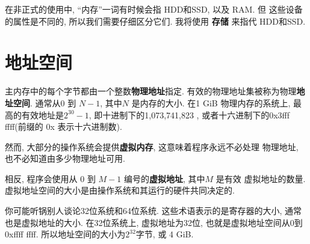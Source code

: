 \documentclass[12pt]{book}
\begin{document}
{在非正式的使用中, ``内存''一词有时候会指 HDD和SSD, 以及 RAM. 但
这些设备的属性是不同的, 所以我们需要仔细区分它们. 我将使用
{\bf 存储} 来指代 HDD和SSD.

\section{地址空间}
%

主内存中的每个字节都由一个整数{\bf 物理地址}指定.
有效的物理地址集被称为物理{\bf 地址空间}.
通常从0 到 $N-1$, 其中$N$ 是内存的大小.
在1 GiB 物理内存的系统上, 最高的有效地址是$2^{30}-1$, 
即十进制下的1,073,741,823 , 或者十六进制下的0x3fff ffff(前缀的 0x 表示十六进制数).

然而, 大部分的操作系统会提供{\bf 虚拟内存}, 这意味着程序永远不必处理
物理地址, 也不必知道由多少物理地址可用.

%

相反, 程序会使用从 0 到 $M-1$ 编号的{\bf 虚拟地址}, 其中$M$ 是有效
虚拟地址的数量. 虚拟地址空间的大小是由操作系统和其运行的硬件共同决定的.

你可能听锅别人谈论32位系统和64位系统.
这些术语表示的是寄存器的大小, 通常也是虚拟地址的大小.
在32位系统上, 虚拟地址为32位, 也就是虚拟地址空间从0到0xffff ffff.
所以地址空间的大小为$2^{32}$字节, 或 4 GiB.

}
\end{document}
